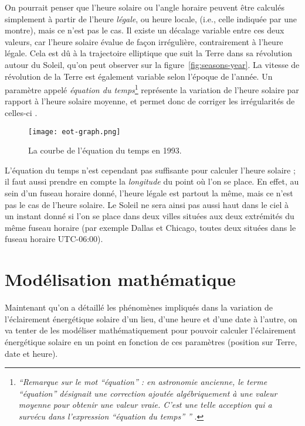 \documentclass[12pt]{article}
\begin{document}
On pourrait penser que l'heure solaire ou l'angle horaire peuvent être calculés simplement à partir de l'heure \emph{légale}, ou heure locale, (i.e., celle indiquée par une montre), mais ce n'est pas le cas.
Il existe un décalage variable entre ces deux valeurs, car l'heure solaire évalue de façon irrégulière, contrairement à l'heure légale.
Cela est dû à la trajectoire elliptique que suit la Terre dans sa révolution autour du Soleil, qu'on peut observer sur la figure~\ref{fig:seasons-year}.
La vitesse de révolution de la Terre est également variable selon l'époque de l'année.
Un paramètre appelé \emph{équation du temps}\footnote{\textit{``Remarque sur le mot ``équation'' : en astronomie ancienne, le terme ``équation'' désignait une correction ajoutée algébriquement à une valeur moyenne pour obtenir une valeur vraie.
C'est une telle acception qui a survécu dans l'expression ``équation du temps'' ''} \cite{equation_temps_wiki}.} représente la variation de l'heure solaire par rapport à l'heure solaire moyenne, et permet donc de corriger les irrégularités de celles-ci \cite{equation_temps_wiki}.

 \begin{figure}[H]
	\centerline{\texttt{[image: eot-graph.png]}}
	\caption{
		La courbe de l'équation du temps en 1993.
	}
	\label{fig:eot-graph}
\end{figure}

L'équation du temps n'est cependant pas suffisante pour calculer l'heure solaire ; il faut aussi prendre en compte la \emph{longitude} du point où l'on se place.
En effet, au sein d'un fuseau horaire donné, l'heure légale est partout la même, mais ce n'est pas le cas de l'heure solaire.
Le Soleil ne sera ainsi pas aussi haut dans le ciel à un instant donné si l'on se place dans deux villes situées aux deux extrémités du même fuseau horaire (par exemple Dallas et Chicago, toutes deux situées dans le fuseau horaire UTC-06:00).



\clearpage
\section{Modélisation mathématique}

Maintenant qu'on a détaillé les phénomènes impliqués dans la variation de l'éclairement énergétique solaire d'un lieu, d'une heure et d'une date à l'autre, on va tenter de les modéliser mathématiquement pour pouvoir calculer l'éclairement énergétique solaire en un point en fonction de ces paramètres (position sur Terre, date et heure).
\end{document}
